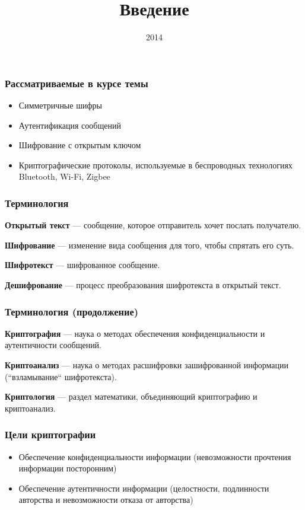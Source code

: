 \documentclass{beamer}
\title{Введение}
\institute{ВГУ}
\date{2014}
\newcommand{\define}[2]{{\bf #1} --- #2.\vspace{1em}}
\begin{document}
\frame{\titlepage}

\begin{frame}
  \frametitle{Рассматриваемые в курсе темы}

  \begin{itemize}
    \item{Симметричные шифры}
    \item{Аутентификация сообщений}
    \item{Шифрование с открытым ключом}
    \item{Криптографические протоколы, используемые в беспроводных технологиях Bluetooth, Wi-Fi, Zigbee}
  \end{itemize}
\end{frame}


\begin{frame}
  \frametitle{Терминология}

  \define{Открытый текст} {сообщение, которое отправитель хочет послать получателю}

  \define{Шифрование} {изменение вида сообщения для того, чтобы спрятать его суть}

  \define{Шифротекст} {шифрованное сообщение}

  \define{Дешифрование} {процесс преобразования шифротекста в открытый текст}
\end{frame}


\begin{frame}
  \frametitle{Терминология (продолжение)}

  \define{Криптография} {наука о методах обеспечения конфиденциальности и аутентичности сообщений}

  \define{Криптоанализ} {наука о методах расшифровки зашифрованной информации (``взламывание`` шифротекста)}

  \define{Криптология} {раздел математики, объединяющий криптографию и криптоанализ}
\end{frame}


\begin{frame}
  \frametitle{Цели криптографии}

  \begin{itemize}
    \itemsep 2em
    \item{Обеспечение конфиденциальности информации (невозможности прочтения информации посторонним)}
    \item{Обеспечение аутентичности информации (целостности, подлинности авторства и невозможности отказа от авторства)}
  \end{itemize}
\end{frame}
\end{document}
